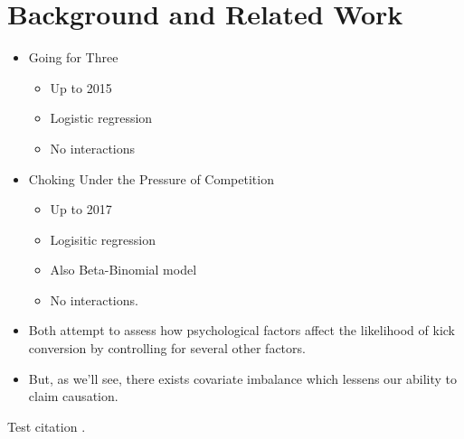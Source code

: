 \chapter{Background and Related Work}

\label{ch:background} 

\begin{itemize}
    \item Going for Three
    \begin{itemize}
        \item Up to 2015
        \item Logistic regression
        \item No interactions
    \end{itemize}
    \item Choking Under the Pressure of Competition
    \begin{itemize}
        \item Up to 2017
        \item Logisitic regression
        \item Also Beta-Binomial model
        \item No interactions.
    \end{itemize}
    \item Both attempt to assess how psychological factors affect the likelihood of kick conversion by controlling for several other factors.
    \item But, as we'll see, there exists covariate imbalance which lessens our ability to claim causation.
\end{itemize}


Test citation \cite{cormen2009introduction}.